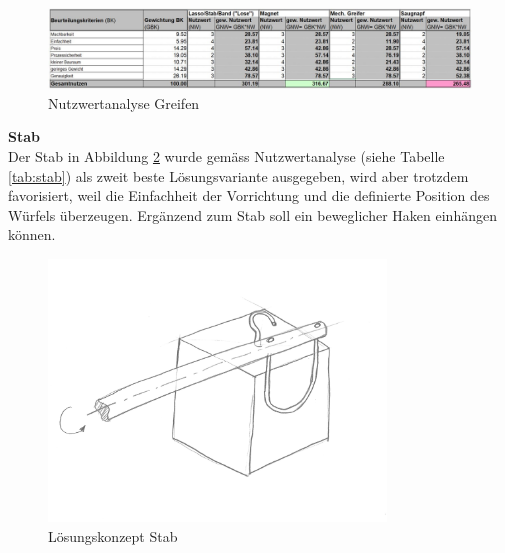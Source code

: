 \documentclass[../../../main.tex]{subfiles}
\begin{document}
 \begin{figure}[H] %
    \centering
    \includegraphics[width=1\textwidth]{Greifen}
    \caption{Nutzwertanalyse Greifen}
    \label{fig:greifen}
\end{figure}

     \textbf{Stab}\\
 Der Stab in Abbildung \ref{fig:stab} wurde gemäss Nutzwertanalyse (siehe Tabelle \ref{tab:stab}) als zweit beste Lösungsvariante ausgegeben, wird aber trotzdem favorisiert, weil die Einfachheit der Vorrichtung und die definierte Position des Würfels überzeugen. Ergänzend zum Stab soll ein beweglicher Haken einhängen können.

 \begin{figure}[H] %
    \centering
    \includegraphics[width=0.8\textwidth]{Stab}
    \caption{Lösungskonzept Stab}
    \label{fig:stab}
\end{figure}
\end{document}
